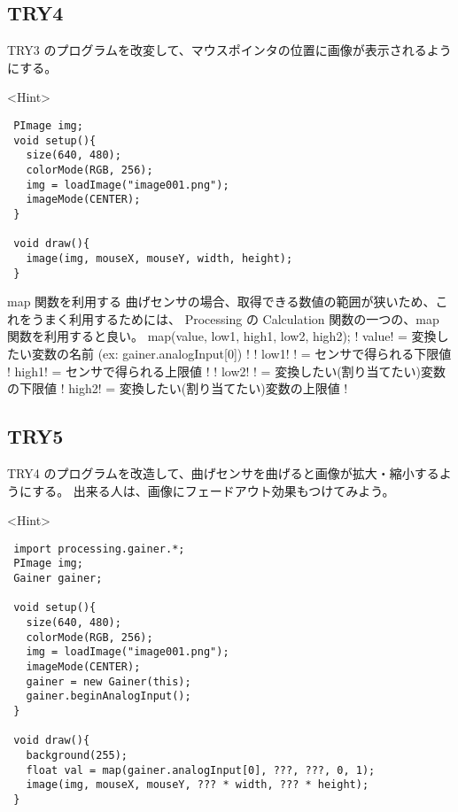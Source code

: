 \documentclass[11pt,a4paper]{jarticle}
\begin{document}
\subsection*{TRY4}
TRY3 のプログラムを改変して、マウスポインタの位置に画像が表示されるようにする。

<Hint>
\begin{lstlisting}
 PImage img;
 void setup(){
   size(640, 480);
   colorMode(RGB, 256);
   img = loadImage("image001.png");
   imageMode(CENTER);
 }
 
 void draw(){
   image(img, mouseX, mouseY, width, height);
 } 
\end{lstlisting}


map 関数を利用する
 曲げセンサの場合、取得できる数値の範囲が狭いため、これをうまく利用するためには、
Processing の Calculation 関数の一つの、map 関数を利用すると良い。
map(value, low1, high1, low2, high2);
! value! = 変換したい変数の名前 (ex: gainer.analogInput[0])
  ! 
! low1! ! = センサで得られる下限値
! high1! = センサで得られる上限値
  ! 
! low2! ! = 変換したい(割り当てたい)変数の下限値
! high2! = 変換したい(割り当てたい)変数の上限値
  !
  
\subsection*{TRY5}
TRY4 のプログラムを改造して、曲げセンサを曲げると画像が拡大・縮小するようにする。
出来る人は、画像にフェードアウト効果もつけてみよう。

<Hint>
\begin{lstlisting}
 import processing.gainer.*;
 PImage img;
 Gainer gainer;

 void setup(){
   size(640, 480);
   colorMode(RGB, 256);
   img = loadImage("image001.png");
   imageMode(CENTER);
   gainer = new Gainer(this);
   gainer.beginAnalogInput();
 }
 
 void draw(){
   background(255);
   float val = map(gainer.analogInput[0], ???, ???, 0, 1);
   image(img, mouseX, mouseY, ??? * width, ??? * height);
 }
\end{lstlisting}
\end{document}
